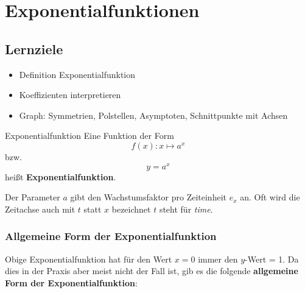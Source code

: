 
\section{Exponentialfunktionen}
\subsection*{Lernziele}

\begin{itemize}
\item Definition Exponentialfunktion
\item Koeffizienten interpretieren
\item Graph: Symmetrien, Polstellen, Asymptoten, Schnittpunkte mit Achsen
\end{itemize}




%



\begin{definition}{Exponentialfunktion}{}
  Eine Funktion der Form $$f(x): x \mapsto a^x$$
  bzw. $$y = a^x$$
  heißt \textbf{Exponentialfunktion}.
\end{definition}

Der Parameter $a$ gibt den Wachstumsfaktor pro Zeiteinheit $e_x$ an.
 Oft wird die Zeitachse auch mit $t$ statt $x$ bezeichnet $t$ steht für \textit{time}.
\newpage

\subsubsection{Allgemeine Form der Exponentialfunktion}

Obige Exponentialfunktion hat für den Wert $x=0$ immer den $y$-Wert = 1. Da dies in der Praxis aber meist nicht der Fall ist, gib es die folgende \textbf{allgemeine Form der Exponentialfunktion}:

